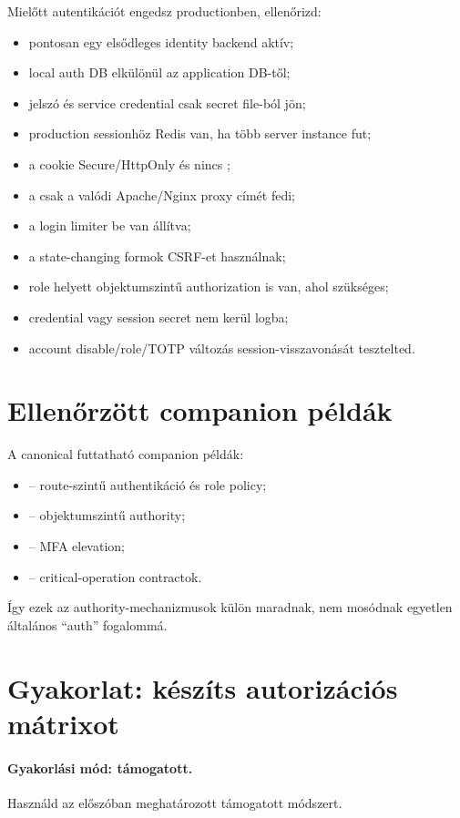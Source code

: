 Mielőtt autentikációt engedsz productionben, ellenőrizd:

\begin{itemize}
  \item pontosan egy elsődleges identity backend aktív;
  \item local auth DB elkülönül az application DB-től;
  \item jelszó és service credential csak secret file-ból jön;
  \item production sessionhöz Redis van, ha több server instance fut;
  \item a cookie Secure/HttpOnly és nincs ;
  \item a  csak a valódi Apache/Nginx proxy címét fedi;
  \item a login limiter be van állítva;
  \item a state-changing formok CSRF-et használnak;
  \item role helyett objektumszintű authorization is van, ahol szükséges;
  \item credential vagy session secret nem kerül logba;
  \item account disable/role/TOTP változás session-visszavonását tesztelted.
\end{itemize}

\section{Ellenőrzött companion példák}
A canonical futtatható companion példák:
\begin{itemize}
  \item {} -- route-szintű authentikáció és role policy;
  \item {} -- objektumszintű authority;
  \item {} -- MFA elevation;
  \item {} -- critical-operation contractok.
\end{itemize}
Így ezek az authority-mechanizmusok külön maradnak, nem mosódnak egyetlen általános ``auth'' fogalommá.

\section{Gyakorlat: készíts autorizációs mátrixot}
\paragraph{Gyakorlási mód: támogatott.} Használd az előszóban meghatározott támogatott módszert.

